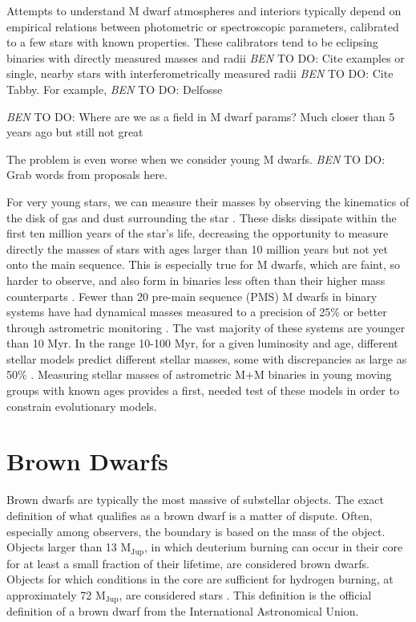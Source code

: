 \documentclass[12pt]{caltech_thesis}
\newcommand{\todo}[3]{{\color{#2} \emph{#1} TO DO: #3}}
\newcommand{\btmtodo}[1]{\todo{BEN}{red}{#1}}
\newcommand{\mjup}{{M$_\textrm{Jup}$}}
\begin{document}
Attempts to understand M dwarf atmospheres and interiors typically depend on empirical 
relations between photometric or spectroscopic parameters, calibrated to a few stars
with known properties.
These calibrators tend to be eclipsing binaries with directly measured masses and radii \btmtodo{Cite 
examples} or single, nearby stars with interferometrically measured radii \btmtodo{Cite Tabby}.
For example, \btmtodo{Delfosse}

\btmtodo{Where are we as a field in M dwarf params? Much closer than 5 years ago
but still not great}

The problem is even worse when we consider young M dwarfs.
\btmtodo{Grab words from proposals here.}

For very young stars, we can measure their masses by observing the kinematics of
the disk of gas and dust surrounding the star \citep{Czekala15, Czekala16}.
These disks dissipate within the first ten million years of the star's life, decreasing the opportunity to measure directly the masses of stars with ages larger than 10 million years but not yet onto the main sequence. 
This is especially true for M dwarfs, which are faint, so harder to observe, and also 
form in binaries less often than their higher mass counterparts \citep{Fischer92, Shan15}.
Fewer than 20 pre-main sequence (PMS) M dwarfs in binary systems have had dynamical masses measured to a
precision of 25\% or better through astrometric monitoring \citep{Dupuy14}.
The vast majority of these systems are younger than 10 Myr.
In the range 10-100 Myr, for a given luminosity and age, different stellar models predict different stellar masses, some with discrepancies as large as 50\% \citep{Hillenbrand04,Schlieder14}.
Measuring stellar masses of astrometric M+M binaries in young moving groups with known 
ages provides a first, needed test of these models in order to constrain evolutionary models.

\section{Brown Dwarfs}
Brown dwarfs are typically the most massive of substellar objects. 
The exact definition of what qualifies as a brown dwarf is a matter of dispute.
Often, especially among observers, the boundary is based on the mass of the object.
Objects larger than 13 \mjup, in which deuterium burning can occur in their core for
at least a small fraction of their lifetime, are considered brown dwarfs.
Objects for which conditions in the core are sufficient for hydrogen burning, at approximately 
72 \mjup, are considered stars \citep{Zuckerman00}.
This definition is the official definition of a brown dwarf from the International
Astronomical Union.
\end{document}

